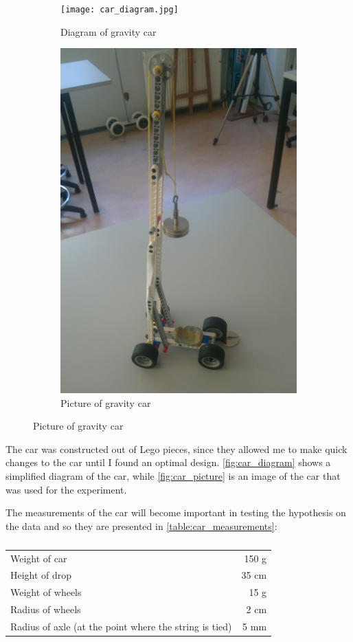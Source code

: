 \documentclass[titlepage,12pt]{article}
\begin{document}
\begin{figure}[H]
    \hspace*{-1.3in}
    \begin{subfigure}{.5\paperwidth}
        \centering
        \texttt{[image: car\_diagram.jpg]}
        \caption{Diagram of gravity car}
        \label{fig:car_diagram}
    \end{subfigure}%
    \begin{subfigure}{.5\paperwidth}
        \centering
        \includegraphics[width=.5\linewidth]{photo_overview.jpg}
        \caption{Picture of gravity car}
        \label{fig:car_picture}
    \end{subfigure}
\end{figure}
%
The car was constructed out of Lego pieces, since they allowed me to make quick changes to
the car until I found an optimal design. \autoref{fig:car_diagram} shows a simplified
diagram of the car, while \autoref{fig:car_picture} is an image of the car that was used for
the experiment.

The measurements of the car will become important in testing the hypothesis on the data and
so they are presented in \autoref{table:car_measurements}:  
%
\begin{table}[H]
    \centering
    \begin{tabular}{l|r}
        Weight of car & 150 g\\
        Height of drop & 35 cm\\
        Weight of wheels & 15 g\\
        Radius of wheels & 2 cm\\
        Radius of axle (at the point where the string is tied) & 5 mm\\
    \end{tabular}
    \caption{}
    \label{table:car_measurements}
\end{table}
    
\end{document}
